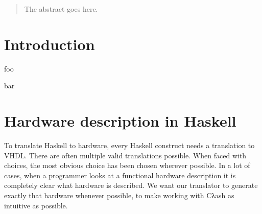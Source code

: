 \documentclass[conference]{IEEEtran}
\def\VHDL{\textsc{VHDL}}
\begin{document}




\maketitle


\begin{abstract}
The abstract goes here.
\end{abstract}





%
\IEEEpeerreviewmaketitle



\section{Introduction}

foo\par bar %

\section{Hardware description in Haskell}

  To translate Haskell to hardware, every Haskell construct needs a
  translation to \VHDL. There are often multiple valid translations
  possible. When faced with choices, the most obvious choice has been
  chosen wherever possible. In a lot of cases, when a programmer looks
  at a functional hardware description it is completely clear what
  hardware is described. We want our translator to generate exactly that
  hardware whenever possible, to make working with Cλash as intuitive as
  possible.
\end{document}
